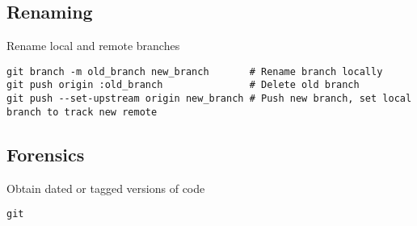 \documentclass[12pt,twoside]{article}
\begin{document}
\subsection{Renaming}\label{sxn:git_rnm}

Rename local and remote branches
\begin{verbatim}
git branch -m old_branch new_branch       # Rename branch locally    
git push origin :old_branch               # Delete old branch
git push --set-upstream origin new_branch # Push new branch, set local branch to track new remote
\end{verbatim}

\subsection{Forensics}\label{sxn:git_rnm}

Obtain dated or tagged versions of code
\begin{verbatim}
git 
\end{verbatim}

%
%
\end{document}
